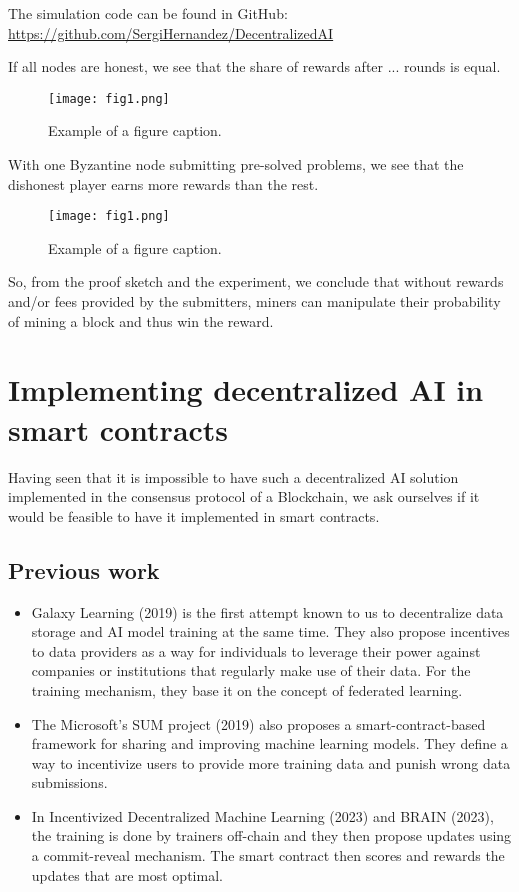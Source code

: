 \documentclass[conference]{IEEEtran}
\begin{document}
The simulation code can be found in GitHub: \url{https://github.com/SergiHernandez/DecentralizedAI}

If all nodes are honest, we see that the share of rewards after ... rounds is equal. 

\begin{figure}[htbp]
\centerline{\texttt{[image: fig1.png]}}
\caption{Example of a figure caption.}
\label{fig}
\end{figure}

With one Byzantine node submitting pre-solved problems, we see that the dishonest player earns more rewards than the rest.

\begin{figure}[htbp]
\centerline{\texttt{[image: fig1.png]}}
\caption{Example of a figure caption.}
\label{fig}
\end{figure}

So, from the proof sketch and the experiment, we conclude that without rewards and/or fees provided by the submitters, miners can manipulate their probability of mining a block and thus win the reward.

\section{Implementing decentralized AI in smart contracts}

Having seen that it is impossible to have such a decentralized AI solution implemented in the consensus protocol of a Blockchain, we ask ourselves if it would be feasible to have it implemented in smart contracts.

\subsection{Previous work}

\begin{itemize}
\item Galaxy Learning (2019)\cite{} is the first attempt known to us to decentralize data storage and AI model training at the same time. They also propose incentives to data providers as a way for individuals to leverage their power against companies or institutions that regularly make use of their data. For the training mechanism, they base it on the concept of federated learning.
\item The Microsoft's SUM project (2019)\cite{} also proposes a smart-contract-based framework for sharing and improving machine learning models. They define a way to incentivize users to provide more training data and punish wrong data submissions.
\item In Incentivized Decentralized Machine Learning (2023)\cite{} and BRAIN (2023)\cite{}, the training is done by trainers off-chain and they then propose updates using a commit-reveal mechanism. The smart contract then scores and rewards the updates that are most optimal.
\end{itemize}
\end{document}
